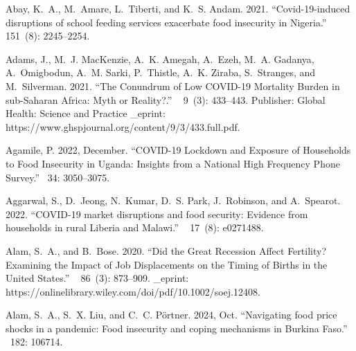\documentclass{wber}
\begin{document}
\begin{thebibliography}{}

Abay, K.~A., M.~Amare, L.~Tiberti, and K.~S. Andam. 2021.
\newblock ``Covid-19-induced disruptions of school feeding services exacerbate
  food insecurity in {Nigeria}.''
~{ 151\/}~(8): 2245--2254.

Adams, J., M.~J. MacKenzie, A.~K. Amegah, A.~Ezeh, M.~A. Gadanya, A.~Omigbodun,
  A.~M. Sarki, P.~Thistle, A.~K. Ziraba, S.~Stranges, and M.~Silverman. 2021.
\newblock ``The {Conundrum} of {Low} {COVID}-19 {Mortality} {Burden} in
  sub-{Saharan} {Africa}: {Myth} or {Reality}?.''
~{ 9\/}~(3): 433--443.
\newblock Publisher: Global Health: Science and Practice \_eprint:
  https://www.ghspjournal.org/content/9/3/433.full.pdf.

Agamile, P. 2022, December.
\newblock ``{COVID}-19 {Lockdown} and {Exposure} of {Households} to {Food}
  {Insecurity} in {Uganda}: {Insights} from a {National} {High} {Frequency}
  {Phone} {Survey}.''
~{34}:
  3050--3075.

Aggarwal, S., D.~Jeong, N.~Kumar, D.~S. Park, J.~Robinson, and A.~Spearot.
  2022.
\newblock ``{COVID}-19 market disruptions and food security: {Evidence} from
  households in rural {Liberia} and {Malawi}.''
~{ 17\/}~(8): e0271488.

Alam, S.~A., and B.~Bose. 2020.
\newblock ``Did the {Great} {Recession} {Affect} {Fertility}? {Examining} the
  {Impact} of {Job} {Displacements} on the {Timing} of {Births} in the {United}
  {States}.''
~{ 86\/}~(3): 873--909.
\newblock \_eprint: https://onlinelibrary.wiley.com/doi/pdf/10.1002/soej.12408.

Alam, S.~A., S.~X. Liu, and C.~C. P{\"o}rtner. 2024, Oct.
\newblock ``Navigating food price shocks in a pandemic: Food insecurity and
  coping mechanisms in {Burkina Faso}.''
~{182}: 106714.


\end{thebibliography}
\end{document}
